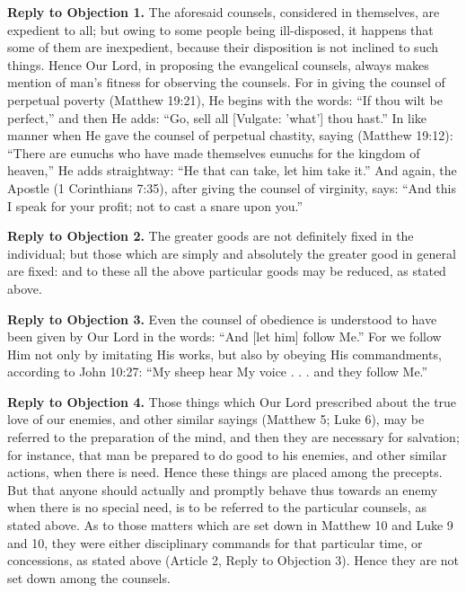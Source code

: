 \textbf{Reply to Objection 1.} The aforesaid counsels, considered in themselves, are expedient to all; but owing to some people being ill-disposed, it happens that some of them are inexpedient, because their disposition is not inclined to such things. Hence Our Lord, in proposing the evangelical counsels, always makes mention of man's fitness for observing the counsels. For in giving the counsel of perpetual poverty (Matthew 19:21), He begins with the words: ``If thou wilt be perfect,'' and then He adds: ``Go, sell all [Vulgate: 'what'] thou hast.'' In like manner when He gave the counsel of perpetual chastity, saying (Matthew 19:12): ``There are eunuchs who have made themselves eunuchs for the kingdom of heaven,'' He adds straightway: ``He that can take, let him take it.'' And again, the Apostle (1 Corinthians 7:35), after giving the counsel of virginity, says: ``And this I speak for your profit; not to cast a snare upon you.''

\textbf{Reply to Objection 2.} The greater goods are not definitely fixed in the individual; but those which are simply and absolutely the greater good in general are fixed: and to these all the above particular goods may be reduced, as stated above.

\textbf{Reply to Objection 3.} Even the counsel of obedience is understood to have been given by Our Lord in the words: ``And [let him] follow Me.'' For we follow Him not only by imitating His works, but also by obeying His commandments, according to John 10:27: ``My sheep hear My voice . . . and they follow Me.''

\textbf{Reply to Objection 4.} Those things which Our Lord prescribed about the true love of our enemies, and other similar sayings (Matthew 5; Luke 6), may be referred to the preparation of the mind, and then they are necessary for salvation; for instance, that man be prepared to do good to his enemies, and other similar actions, when there is need. Hence these things are placed among the precepts. But that anyone should actually and promptly behave thus towards an enemy when there is no special need, is to be referred to the particular counsels, as stated above. As to those matters which are set down in Matthew 10 and Luke 9 and 10, they were either disciplinary commands for that particular time, or concessions, as stated above (Article 2, Reply to Objection 3). Hence they are not set down among the counsels.
